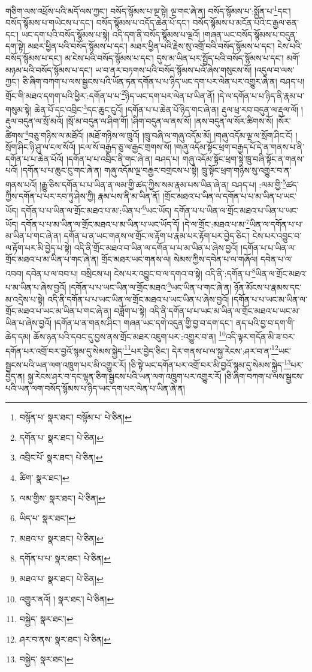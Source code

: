 གཅིག་ལས་འཕྲོས་པའི་མདོ་ལས་ཀྱང་། བསོད་སྙོམས་པ་ལྔ་སྟེ། ལྔ་གང་ཞེ་ན། བསོད་སྙོམས་པ་:སྨྱོན་པ་\footnote{བསྙོན་པ་  སྣར་ཐང་། བསྙོམ་པ་  པེ་ཅིན། }དང་། བསོད་སྙོམས་པ་གཡེངས་པ་དང་། བསོད་སྙོམས་པ་འདོད་ཆེན་པོ་དང་། བསོད་སྙོམས་པ་མངོན་པའི་ང་རྒྱལ་ཅན་དང་། ཡང་དག་པའི་བསོད་སྙོམས་པ་སྟེ། འདི་དག་ནི་བསོད་སྙོམས་པ་ལྔའོ། །གཞན་ཡང་བསོད་སྙོམས་པ་བདུན་དག་སྟེ། མཐར་ཕྱིན་པའི་བསོད་སྙོམས་པ་དང་། མཐར་ཕྱིན་པའི་རྗེས་སུ་འགྲོ་བའི་བསོད་སྙོམས་པ་དང་། ངེས་པའི་བསོད་སྙོམས་པ་དང་། མ་ངེས་པའི་བསོད་སྙོམས་པ་དང་། དུས་མ་ཡིན་པར་སྤྱོད་པའི་བསོད་སྙོམས་པ་དང་། མགོ་མཉམ་པའི་བསོད་སྙོམས་པ་དང་། ཡ་བ་ནར་བཏགས་པའི་བསོད་སྙོམས་པའོ་ཞེས་གསུངས་སོ། །འདུལ་བ་ལས་ཀྱང་། ཅི་ཞིག་བཀག་པ་ལས་སྦྱངས་པའི་ཡོན་ཏན་དགོན་པ་པ་ཉིད་ཡང་དག་པར་ལེན་པར་འགྱུར་ཞེ་ན། བཤད་པ། གྲོང་གི་མཐའ་དགག་པའི་ཕྱིར་:དགོན་པ་པ་\footnote{དགོན་པ་  སྣར་ཐང་།  པེ་ཅིན། }ཉིད་ཡང་དག་པར་ལེན་པ་ཡིན་ནོ། །དེ་ལ་དགོན་པ་པ་ཉིད་ནི་རྣམ་པ་གསུམ་སྟེ། ཆེན་པོ་དང་འབྲིང་\footnote{འབྲིང་པོ་  སྣར་ཐང་།  པེ་ཅིན། }དང་ཆུང་ངུའོ། །དགོན་པ་པ་ཆེན་པོ་ཉིད་གང་ཞེ་ན། རྡུལ་ཕྲ་རབ་བདུན་ལ་རྡུལ་ལོ། །རྡུལ་བདུན་ལ་སྲོ་མའོ། །སྲོ་མ་བདུན་ལ་ཤིག་གོ། །ཤིག་བདུན་ལ་ནས་སོ། །ནས་བདུན་ལ་སོར་ཚིགས་སོ། །སོར་ཚིགས་\footnote{ཚིག་  སྣར་ཐང་། }བཅུ་གཉིས་ལ་མཐོའོ། །མཐོ་གཉིས་ལ་ཁྲུའོ། །ཁྲུ་བཞི་ལ་གཞུ་འདོམ་མོ། །གཞུ་འདོམ་ལྔ་ལ་སྲོག་ཤིང་ངོ། །སྲོག་ཤིང་ཉི་ཤུ་ལ་ངལ་སོའོ། །ངལ་སོ་བརྒྱད་ཅུ་ལ་རྒྱང་གྲགས་སོ། །གཞུ་འདོམ་སྟོང་ཕྲག་བརྒྱད་པོ་དེ་ན་གནས་པ་ནི་དགོན་པ་པ་ཆེན་པོའོ། །དགོན་པ་པ་འབྲིང་ནི་གང་ཞེ་ན། བཤད་པ། གཞུ་འདོམ་སྟོང་ཕྲག་སྟེ་ཁྲུ་བཞི་སྟོང་ན་གནས་པའོ། །དགོན་པ་པ་ཆུང་ངུ་གང་ཞེ་ན། གཞུ་འདོམ་ལྔ་བརྒྱར་བགྲངས་པ་སྟེ། ཁྲུ་སྟོང་ཕྲག་གཉིས་སུ་འགྱུར་བ་ན་གནས་པའོ། །རྒྱུ་ཅིས་དགོན་པ་པ་ཡིན་ན་ལམ་གྱི་ཚད་ཀྱིས་སམ་རྣམ་པས་ཡིན་ཞེ་ན། བཤད་པ། :ལམ་གྱི་\footnote{ལམ་གྱིས་  སྣར་ཐང་།  པེ་ཅིན། }ཚད་ཀྱིས་དགོན་པ་པར་རབ་ཏུ་ཤེས་ཀྱི། རྣམ་པས་ནི་མ་ཡིན་ནོ། །གྲོང་མཐའ་པ་ཡིན་ལ་དགོན་པ་པ་མ་ཡིན་པ་ཡང་ཡོད། དགོན་པ་པ་ཡིན་ལ་གྲོང་མཐའ་པ་མ་:ཡིན་པ་\footnote{ཡིད་པ་  སྣར་ཐང་། }ཡང་ཡོད། དགོན་པ་པ་ཡིན་ལ་གྲོང་མཐའ་པ་ཡིན་པ་ཡང་ཡོད། དགོན་པ་པ་མ་ཡིན་ལ་གྲོང་མཐའ་པ་མ་ཡིན་པ་ཡང་ཡོད་དོ། །དེ་ལ་གྲོང་:མཐའ་པ་མ་\footnote{མཐའ་པ་  སྣར་ཐང་།  པེ་ཅིན། }ཡིན་ལ་དགོན་པ་པ་མ་ཡིན་པ་གང་ཞེ་ན། དགོན་པ་ན་ཡང་གནས་ལ་གྲོང་ལ་རྟོག་པ་རྣམ་པར་རྟོག་པར་བྱེད་ཅིང་། ངེས་པར་འབྱུང་བ་ལ་རྟོག་པར་མི་བྱེད་པ་སྟེ། འདི་ནི་གྲོང་མཐའ་བ་ཡིན་ལ་དགོན་པ་པ་མ་ཡིན་པ་ཞེས་བྱའོ། །དགོན་པ་པ་ཡིན་ལ་གྲོང་མཐའ་པ་མ་ཡིན་པ་གང་ཞེ་ན། གྲོང་མཐར་ཡང་གནས་ལ། སེམས་ཀྱིས་དབེན་པ་ལ་གཞོལ། དབེན་པ་ལ་འབབ། དབེན་པ་ལ་བབ་པ། བསྲིངས་པ། ངེས་པར་འབྱུང་བ་ལ་དགའ་བ་སྟེ། འདི་ནི་:དགོན་པ་\footnote{དགོན་པ་པ་  སྣར་ཐང་།  པེ་ཅིན། }ཡིན་ལ་གྲོང་མཐའ་པ་མ་ཡིན་པ་ཞེས་བྱའོ། །དགོན་པ་པ་ཡང་ཡིན་ལ་གྲོང་མཐའ་\footnote{མཐའ་པ་  སྣར་ཐང་།  པེ་ཅིན། }ཡང་ཡིན་པ་གང་ཞེ་ན། ཉོན་མོངས་པ་རྣམས་དང་མ་འདྲེས་པ་སྟེ། འདི་ནི་དགོན་པ་པ་ཡང་ཡིན་ལ་གྲོང་མཐའ་པ་ཡང་ཡིན་པ་ཞེས་བྱའོ། །དགོན་པ་པ་ཡང་མ་ཡིན་ལ་གྲོང་མཐའ་པ་ཡང་མ་ཡིན་པ་གང་ཞེ་ན། བཟློག་པ་སྟེ། འདི་ནི་དགོན་པ་པ་ཡང་མ་ཡིན་ལ་གྲོང་མཐའ་པ་ཡང་མ་ཡིན་པ་ཞེས་བྱའོ། །དགོན་པ་ན་གནས་ཤིང་། གཞན་ཡང་དགེ་འདུན་གྱི་བྱ་བ་དག་དང་། ནད་པའི་བྱ་བ་དག་གི་ཆེད་དམ། ཆོས་ཉན་པའི་དབང་དུ་བྱས་ནས་གྲོང་མཐར་འཇུག་པར་:འགྱུར་བ་ན། \footnote{འགྱུར་ནའོ། །   སྣར་ཐང་།  པེ་ཅིན། }འདི་ལྟར་གདོན་མི་ཟ་བར་དགོན་པར་འགྲོ་བར་བྱའོ་སྙམ་དུ་སེམས་སྐྱེད་\footnote{བསྐྱེད་  སྣར་ཐང་། }པར་བྱེད་ཅིང་། དེར་གནས་པ་ལ་སྐྱ་རེངས་:ཤར་བ་ན་\footnote{ཤར་བ་ནས་  སྣར་ཐང་།  པེ་ཅིན། }ཡང་སྦྱངས་པའི་ཡན་ལག་འཁྲུག་པར་མི་འགྱུར་རོ། །ཅི་སྟེ་ཡང་དགོན་པར་འགྲོ་བར་མི་བྱའོ་སྙམ་དུ་སེམས་སྐྱེད་\footnote{བསྐྱེད་  སྣར་ཐང་། }པར་བྱེད་ན། སྐྱ་རེངས་ཤར་བ་དང་ལྷན་ཅིག་སྦྱངས་པའི་ཡན་ལག་འཁྲུག་པར་འགྱུར་རོ། །ཅི་ཞིག་བཀག་པ་ལས་སྦྱངས་པའི་ཡན་ལག་བསོད་སྙོམས་པ་ཉིད་ཡང་དག་པར་ལེན་པ་ཡིན་ཞེ་ན། 